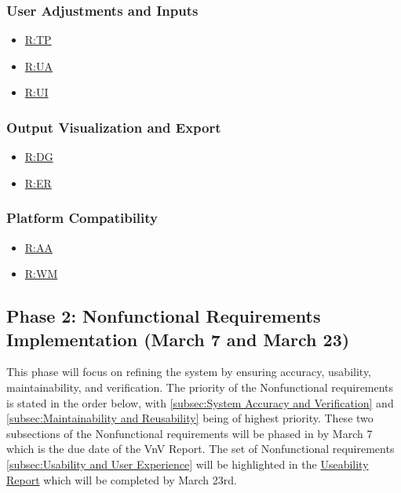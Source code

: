 \documentclass[12pt]{article}
\newcommand{\hpref}[1]{\hyperref[#1]{#1}}
\begin{document}
  \subsubsection{User Adjustments and Inputs}
  \label{subsec:User Adjustments and Inputs}
  \begin{itemize}
      \item \hpref{R:TP}
      \item \hpref{R:UA}
      \item \hpref{R:UI}
  \end{itemize}

  \subsubsection{Output Visualization and Export}
  \begin{itemize}
      \item \hpref{R:DG}
      \item \hpref{R:ER}
  \end{itemize}
  
  \subsubsection{Platform Compatibility}
  \begin{itemize}
      \item \hpref{R:AA}
      \item \hpref{R:WM}
  \end{itemize}
  
  \subsection{Phase 2: Nonfunctional Requirements Implementation (March 7 and March 23) }
  
  This phase will focus on refining the system by ensuring accuracy, usability, maintainability, and verification.
  The priority of the Nonfunctional requirements is stated in the order below, with \ref{subsec:System Accuracy and Verification} and \ref{subsec:Maintainability and Reusability} being of highest priority.
  These two subsections of the Nonfunctional requirements will be phased in by March 7 which is the due date of the VnV Report. 
  The set of Nonfunctional requirements \ref{subsec:Usability and User Experience} will be highlighted in the \href{https://github.com/gr812b/CVT-Simulator/blob/main/docs/UsabilityReport/UsabilityReport.pdf}{Useability Report} which will be completed by March 23rd.
  
\end{document}
